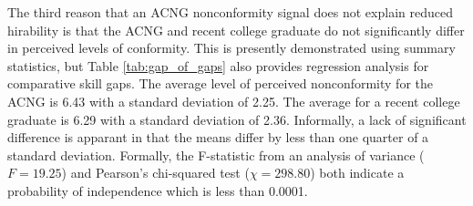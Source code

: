 \documentclass[review]{elsarticle}
\begin{document}
The third reason that an ACNG nonconformity signal does not explain reduced hirability is that the ACNG and recent college graduate do not significantly differ in perceived levels of conformity.
This is presently demonstrated using summary statistics, but Table \ref{tab:gap_of_gaps} also provides regression analysis for comparative skill gaps.
The average level of perceived nonconformity for the ACNG is 6.43 with a standard deviation of 2.25.
The average for a recent college graduate is 6.29 with a standard deviation of 2.36.
Informally, a lack of significant difference is apparant in that the means differ by less than one quarter of a standard deviation.
Formally, the F-statistic from an analysis of variance ($F = 19.25$) and Pearson's chi-squared test ($\chi = 298.80$) both indicate a probability of independence which is less than 0.0001.
\end{document}
